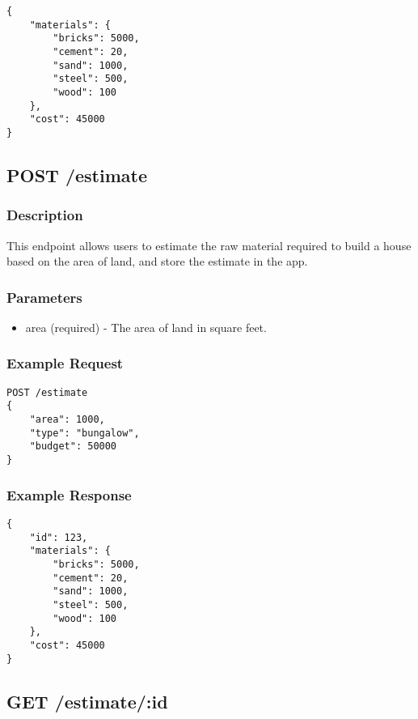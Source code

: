 \documentclass{article}
\begin{document}
\begin{verbatim}
{
    "materials": {
        "bricks": 5000,
        "cement": 20,
        "sand": 1000,
        "steel": 500,
        "wood": 100
    },
    "cost": 45000
}
\end{verbatim}

\subsection{POST /estimate}

\subsubsection{Description}

This endpoint allows users to estimate the raw material required to build a house based on the area of land, and store the estimate in the app.

\subsubsection{Parameters}

\begin{itemize}
  \item area (required) - The area of land in square feet.
\end{itemize}

\subsubsection{Example Request}

\begin{verbatim}
POST /estimate
{
    "area": 1000,
    "type": "bungalow",
    "budget": 50000
}
\end{verbatim}

\subsubsection{Example Response}

\begin{verbatim}
{
    "id": 123,
    "materials": {
        "bricks": 5000,
        "cement": 20,
        "sand": 1000,
        "steel": 500,
        "wood": 100
    },
    "cost": 45000
}
\end{verbatim}

\subsection{GET /estimate/:id}
\end{document}
